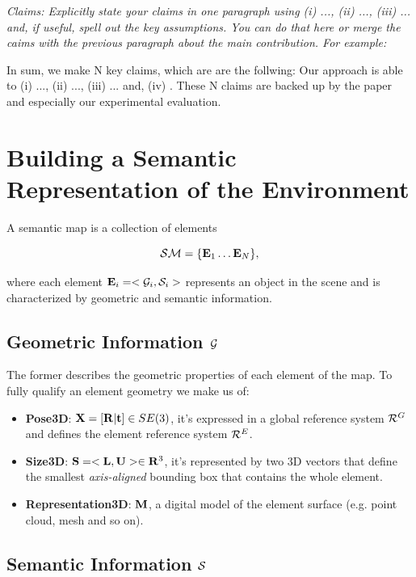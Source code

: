\documentclass[letterpaper, 10 pt, conference]{ieeeconf}  %
\begin{document}
{\color{blue}\emph{Claims: Explicitly state your claims in one paragraph using (i)
  ..., (ii) ..., (iii) ... and, if useful, spell out the key
  assumptions. You can do that here or merge the caims with the
  previous paragraph about the main contribution. For example:}}

In sum, we make N key claims, which are are the follwing:
Our approach is able to
%
(i) ..., 
%
(ii) ..., 
%
(iii) ... and,
%
(iv) . 
% 
These N claims are backed up by the paper and especially 
our experimental evaluation.


\section{Building a Semantic Representation of the Environment}
\label{sec:map}

A semantic map is a collection of elements

\begin{equation}
\mathcal{SM} = \{ \mathbf{E}_1 \dots \mathbf{E}_N \},
\end{equation}

where each element $\mathbf{E}_i = < \mathcal{G}_i, \mathcal{S}_i>$ represents an object in the scene and is characterized by geometric and semantic information.

\subsection{Geometric Information $\mathcal{G}$}

The former describes the geometric properties of each element of the map. To fully qualify an element geometry we make us of:
\begin{itemize}
	\item {\bf Pose3D}: $\mathbf{X} = [ \mathbf{R} | \mathbf{t}] \in SE(3)$, it's expressed in a global reference system $\mathcal{R}^G$ and defines the element reference system $\mathcal{R}^E$.
	\item {\bf Size3D}: $\mathbf{S} = <\mathbf{L} ,\mathbf{U}> \in \mathbf{R}^3 $, it's represented by two 3D vectors that define the smallest \emph{axis-aligned} bounding box that contains the whole element.
	\item {\bf Representation3D}: $\mathbf{M}$, a digital model of the element surface (e.g. point cloud, mesh and so on).
\end{itemize}

\subsection{Semantic Information $\mathcal{S}$}
\end{document}

